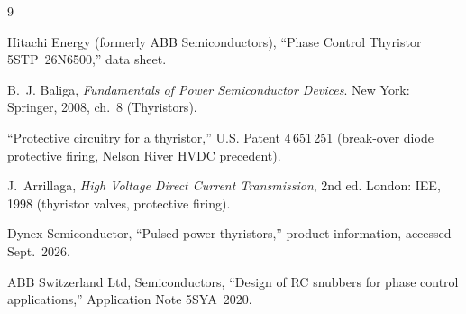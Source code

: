 \documentclass[11pt,a4paper]{article}
\begin{document}
\begin{thebibliography}{9}

Hitachi Energy (formerly ABB Semiconductors), ``Phase Control Thyristor 5STP~26N6500,'' data sheet.

B.~J. Baliga, \emph{Fundamentals of Power Semiconductor Devices}. New York: Springer, 2008,
ch.~8 (Thyristors).

``Protective circuitry for a thyristor,'' U.S. Patent 4\,651\,251 (break-over diode protective firing, Nelson River HVDC precedent).

J.~Arrillaga, \emph{High Voltage Direct Current Transmission}, 2nd ed. London: IEE, 1998
(thyristor valves, protective firing).

Dynex Semiconductor, ``Pulsed power thyristors,'' product information, accessed Sept.~2026.

ABB Switzerland Ltd, Semiconductors, ``Design of RC snubbers for phase control applications,''
Application Note 5SYA~2020.

\end{thebibliography}
\end{document}
